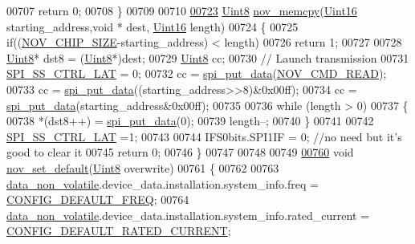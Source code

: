 \begin{DoxyCode}
00707     \textcolor{keywordflow}{return} 0;
00708 \}
00709 
00710 
\hypertarget{a00060_source_l00723}{}\hyperlink{a00060_a3ff681f3af83ec441535611dac6ada16}{00723} \hyperlink{a00072_af84840501dec18061d18a68c162a8fa2}{Uint8}  \hyperlink{a00060_a3ff681f3af83ec441535611dac6ada16}{nov\_memcpy}(\hyperlink{a00072_a59a9f6be4562c327cbfb4f7e8e18f08b}{Uint16} starting\_address,\textcolor{keywordtype}{void} * dest, 
      \hyperlink{a00072_a59a9f6be4562c327cbfb4f7e8e18f08b}{Uint16} length)
00724 \{
00725     \textcolor{keywordflow}{if}((\hyperlink{a00029_acbac04a78072f0322171ea94017f246e}{NOV\_CHIP\_SIZE}-starting\_address) < length)
00726         \textcolor{keywordflow}{return} 1;
00727 
00728     \hyperlink{a00072_af84840501dec18061d18a68c162a8fa2}{Uint8}* dst8 = (\hyperlink{a00072_af84840501dec18061d18a68c162a8fa2}{Uint8}*)dest;
00729     \hyperlink{a00072_af84840501dec18061d18a68c162a8fa2}{Uint8}  cc;
00730     \textcolor{comment}{// Launch transmission}
00731     \hyperlink{a00013_aa8b53e04161d178ebd9c01edf1584039}{SPI\_SS\_CTRL\_LAT} = 0;
00732     cc = \hyperlink{a00013_a19e2dff580e4d1b2198fa9108fca81ac}{spi\_put\_data}(\hyperlink{a00029_a9d4dca4a65e8cabd1d733922725309e4}{NOV\_CMD\_READ});
00733     cc = \hyperlink{a00013_a19e2dff580e4d1b2198fa9108fca81ac}{spi\_put\_data}((starting\_address>>8)&0x00ff);
00734     cc = \hyperlink{a00013_a19e2dff580e4d1b2198fa9108fca81ac}{spi\_put\_data}(starting\_address&0x00ff);
00735 
00736     \textcolor{keywordflow}{while} (length > 0)
00737     \{
00738            *(dst8++) = \hyperlink{a00013_a19e2dff580e4d1b2198fa9108fca81ac}{spi\_put\_data}(0);
00739            length--;
00740     \}
00741 
00742     \hyperlink{a00013_aa8b53e04161d178ebd9c01edf1584039}{SPI\_SS\_CTRL\_LAT} =1;
00743 
00744     IFS0bits.SPI1IF = 0;   \textcolor{comment}{//no need but it's good to clear it}
00745     \textcolor{keywordflow}{return} 0;
00746 \}
00747 
00748 
00749 
\hypertarget{a00060_source_l00760}{}\hyperlink{a00060_ada4ee53cb163a9ed3e2b4a5c7192690a}{00760} \textcolor{keywordtype}{void}  \hyperlink{a00060_ada4ee53cb163a9ed3e2b4a5c7192690a}{nov\_set\_default}(\hyperlink{a00072_af84840501dec18061d18a68c162a8fa2}{Uint8} overwrite)
00761 \{
00762 
00763         \hyperlink{a00060_a76ac5f917f5308dcd83de0d7c94559fb}{data\_non\_volatile}.device\_data.installation.system\_info.freq                     = 
      \hyperlink{a00021_a985a153b3edd3d7d638137ae0b9e5e67}{CONFIG\_DEFAULT\_FREQ};
00764         \hyperlink{a00060_a76ac5f917f5308dcd83de0d7c94559fb}{data\_non\_volatile}.device\_data.installation.system\_info.rated\_current            = 
      \hyperlink{a00021_ae329eb408f386777cbb443c27ca7c1c5}{CONFIG\_DEFAULT\_RATED\_CURRENT};

\end{DoxyCode}
